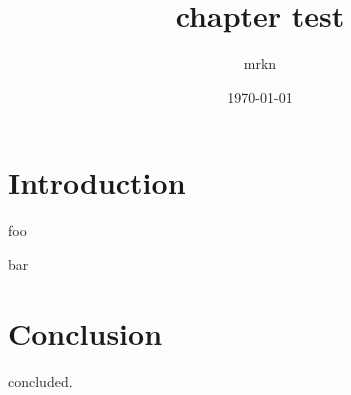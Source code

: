 \documentclass[b5paper]{jsbook}
\begin{document}
\title{chapter test}
\author{mrkn}
\date{\today}
\maketitle


\chapter{Introduction}

foo

bar

\chapter{Conclusion}

concluded.
\end{document}
